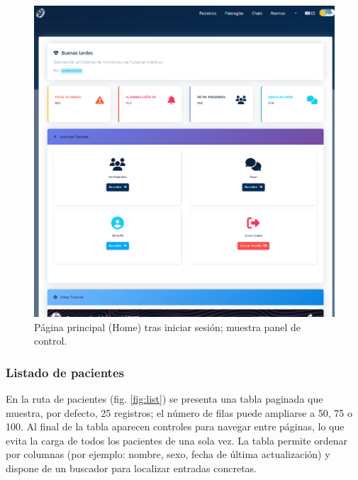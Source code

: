 \documentclass[12pt, a4paper]{article}
\begin{document}
\begin{umaappendices}
	\begin{figure}[htbp]
		\centering
		\includegraphics[width=1\textwidth]{images/3_home.png}
		\caption[Ejemplo]{Página principal (Home) tras iniciar sesión; muestra panel de control.}
		\label{fig:alter}
	\end{figure}
	
	\subsubsection{Listado de pacientes}
	En la ruta de pacientes (fig. \ref{fig:list}) se presenta una tabla paginada que muestra, por defecto, 25 registros; el número de filas puede ampliarse a 50, 75 o 100. Al final de la tabla aparecen controles para navegar entre páginas, lo que evita la carga de todos los pacientes de una sola vez. La tabla permite ordenar por columnas (por ejemplo: nombre, sexo, fecha de última actualización) y dispone de un buscador para localizar entradas concretas.
	

\end{umaappendices}
\end{document}
